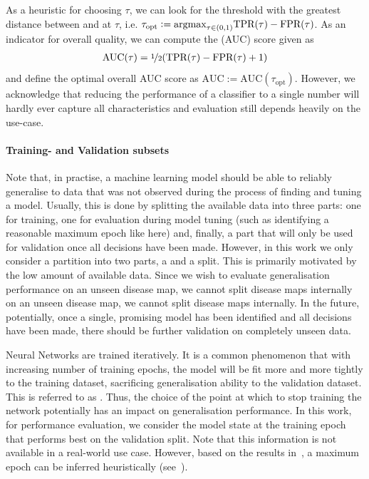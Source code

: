 \documentclass[
	fontsize=10pt, %
	twoside=true, %
	secnumdepth=1, %
  toc=indentunnumbered %
]{kaobook}
\begin{document}
As a heuristic for choosing $\tau$, we can look for the threshold with the greatest
distance between \TPR{} and \FPR{} at $\tau$, i.e. $\tau_{\text{opt}} := \argmax_{\tau \in
  (0,1)} \TPR{}(\tau) - \FPR{}(\tau)$.
As an indicator for overall quality, we can compute the 
(AUC) score given as
\begin{align*}
  \text{AUC}(\tau) = \nicefrac{1}{2} (\TPR{}(\tau) - \FPR{}(\tau) + 1)
\end{align*}
and define the optimal overall AUC score as $\text{AUC} := \text{AUC}(\tau_{\text{opt}})$.
However, we acknowledge that reducing the performance of a classifier to a
single number will hardly ever capture all characteristics and evaluation still
depends heavily on the use-case.


\paragraph{Training- and Validation subsets}
Note that, in practise, a machine learning model should be able to reliably generalise to data
that was not observed during the process of finding and tuning a model. Usually,
this is done by splitting the available data into three parts: one for training,
one for evaluation during model tuning (such as identifying a reasonable maximum
epoch like here) and, finally, a part that will only be used for validation once
all decisions have been made.
%
However, in this work we only consider a partition into two parts, a
 and a  split. This is primarily motivated by the
low amount of available data. Since we wish to evaluate generalisation
performance on an unseen disease map, we cannot split disease maps internally on
an unseen disease map, we cannot split disease maps internally.
% 
In the future, potentially, once a single, promising model has been identified
and all decisions have been made, there should be further validation on completely
unseen data.

Neural Networks are trained iteratively. It is a common phenomenon that with
increasing number of training epochs, the model will be fit more and more
tightly to the training dataset, sacrificing generalisation ability to the
validation dataset. This is referred to as . Thus, the choice
of the point at which to stop training the network potentially has an impact on
generalisation performance. In this work, for performance evaluation, we
consider the model state at the training epoch that performs best on the
validation split. Note that this information is not available in a real-world
use case. However, based on the results in~, a maximum epoch
can be inferred heuristically (see~).
\end{document}
